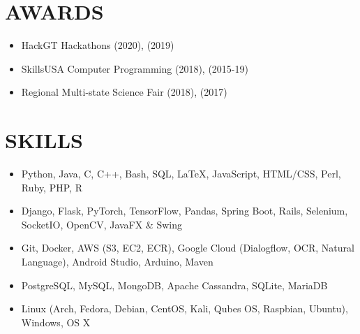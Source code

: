 \documentclass[11pt,letterpaper]{article}
\begin{document}
  \section*{AWARDS}

  \begin{itemize}
    \item{
      HackGT Hackathons \textemdash{}
      {}
      (2020),
      {}
      (2019)
    }



    \item{
      SkillsUSA Computer Programming
      \textemdash{}
      {}
      (2018),
      {}
      (2015-19)
    }

    \item{
      Regional Multi-state Science Fair
      \textemdash{}
      {}
      (2018),
      {}
      (2017)
    }
  \end{itemize}

  \smallskip


  \section*{SKILLS}

  \begin{itemize}
    \item{
      {}
      Python, Java, C, C++, Bash, SQL, \LaTeX, JavaScript, HTML/CSS, Perl, Ruby, PHP, R
    }

    \item{
      {}
      Django, Flask, PyTorch, TensorFlow, Pandas, Spring Boot, Rails, Selenium, SocketIO, OpenCV, JavaFX \& Swing
    }

    \item{
      {}
      Git, Docker, AWS (S3, EC2, ECR), Google Cloud (Dialogflow, OCR, Natural Language), Android Studio, Arduino, Maven
    }

    \item{
      {}
      PostgreSQL, MySQL, MongoDB, Apache Cassandra, SQLite, MariaDB
    }

    \item{
      {}
      Linux (Arch, Fedora, Debian, CentOS, Kali, Qubes OS, Raspbian, Ubuntu), Windows, OS X
    }
  \end{itemize}
\end{document}
